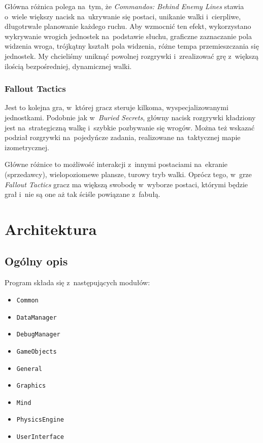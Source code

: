 \documentclass[licencjacka]{pracamgr}
\begin{document}
      Główna różnica polega na~tym, że \emph{Commandos: Behind Enemy Lines} stawia o~wiele większy nacisk na~ukrywanie się postaci, unikanie walki
      i~cierpliwe, długotrwałe planowanie każdego ruchu. Aby wzmocnić ten efekt, wykorzystano wykrywanie wrogich jednostek na~podstawie słuchu,
      graficzne zaznaczanie pola widzenia wroga, trójkątny kształt pola widzenia, różne tempa przemieszczania się jednostek.
      My chcieliśmy uniknąć powolnej rozgrywki i~zrealizować grę z~większą ilością bezpośredniej, dynamicznej walki.

    \subsection{Fallout Tactics}
      Jest to kolejna gra, w~której gracz steruje kilkoma, wyspecjalizowanymi jednostkami. Podobnie jak w~\emph{Buried Secrets}, główny nacisk rozgrywki
      kładziony jest na~strategiczną walkę i~szybkie pozbywanie się wrogów. Można też wskazać podział rozgrywki na~pojedyńcze zadania,
      realizowane na~taktycznej mapie izometrycznej.

      Główne różnice to możliwość interakcji z~innymi postaciami na~ekranie (sprzedawcy), wielopoziomewe plansze, turowy tryb walki. Oprócz tego,
      w~grze \emph{Fallout Tactics} gracz ma większą swobodę w~wyborze postaci, którymi będzie grał i~nie są one aż tak ściśle powiązane z~fabułą.


\chapter{Architektura}
  \section{Ogólny opis}
    Program składa się z~następujących modułów:
    \begin{itemize}
      \item \texttt{Common}
      \item \texttt{DataManager}
      \item \texttt{DebugManager}
      \item \texttt{GameObjects}
      \item \texttt{General}
      \item \texttt{Graphics}
      \item \texttt{Mind}
      \item \texttt{PhysicsEngine}
      \item \texttt{UserInterface}
    \end{itemize}
\end{document}
